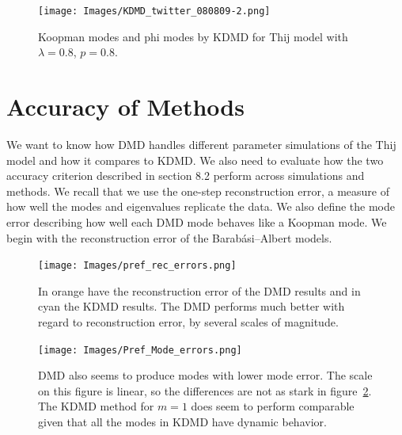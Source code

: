 \begin{figure}
    \texttt{[image: Images/KDMD\_twitter\_080809-2.png]}
    \centering
    \caption{Koopman modes and phi modes by KDMD for Thij model
    with $\lambda=0.8$, $p=0.8$.}
    \label{fig:dmd08084}
\end{figure}

\FloatBarrier
\clearpage

\section{Accuracy of Methods}

We want to know how DMD handles different parameter simulations of the Thij model and how it compares to KDMD.
 We also need to evaluate how the two accuracy criterion described in section 8.2 perform across
simulations and methods. We recall that we use the one-step reconstruction error, a measure of 
how well the modes and eigenvalues replicate the data. We also define the mode error describing how 
well each DMD mode behaves like a Koopman mode. We begin with the
reconstruction error of the Barabási–Albert models.

\begin{figure}
    \texttt{[image: Images/pref\_rec\_errors.png]}
    \centering
    \caption{In orange have the reconstruction error of the DMD results and in cyan 
    the KDMD results. The DMD performs much better with regard to reconstruction error, by several scales of magnitude.}
    \label{fig:prefrecerror}
\end{figure} 

\begin{figure}
    \texttt{[image: Images/Pref\_Mode\_errors.png]}
    \centering
    \caption{DMD also seems to produce modes with lower mode error. The scale on this figure is linear,
    so the differences are not as stark in figure~\ref{fig:prefrecerror}. The KDMD method for $m=1$
    does seem to perform comparable given that all the modes in KDMD have dynamic behavior.}
\end{figure} 


